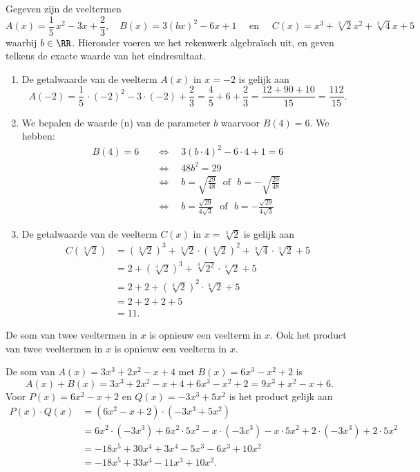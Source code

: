 \documentclass{ximera}
\begin{document}
\begin{example}
Gegeven zijn de veeltermen
\[
A(x) = \frac{1}{5}\,x^2-3x+\frac{2}{3}, \quad B(x) = 3(bx)^2-6x+1 \quad \text{ en } \quad C(x) = x^3 + \sqrt[3]{2} x^2 + \sqrt[3]{4}x+5
\]
waarbij $b \in \RR$. Hieronder voeren we het rekenwerk algebra\"isch uit, en geven telkens de exacte waarde van het eindresultaat. 
\begin{enumerate}

\item
De getalwaarde van de veelterm $A(x)$ in $x = -2$ is gelijk aan
\[
A(-2) = \frac{1}{5}\,\cdot (-2)^2-3\cdot(-2)+\frac{2}{3} = \frac{4}{5} +6+ \frac{2}{3} = \frac{12 + 90 + 10}{15} = \frac{112}{15}.
\]
\item
We bepalen de waarde (n) van de parameter $b$ waarvoor $B(4) = 6$. We hebben:
\begin{align*}
B(4) = 6 \quad 
& \Leftrightarrow \quad 3(b\cdot 4)^2-6\cdot 4+1 = 6 \\ 
& \Leftrightarrow \quad 48b^2 = 29 \\
& \Leftrightarrow \quad b = \sqrt{\frac{29}{48}} \,\,\text{ of }\,\, b = - \sqrt{\frac{29}{48}} \\
& \Leftrightarrow \quad b = \frac{\sqrt{29}}{4\sqrt{3}} \,\,\text{ of }\,\, b = - \frac{\sqrt{29}}{4\sqrt{3}}
\end{align*}
\item
De getalwaarde van de veelterm $C(x)$ in $x = \sqrt[3]{2}$ is gelijk aan
\begin{align*}
C(\sqrt[3]{2}) & = (\sqrt[3]{2})^3 + \sqrt[3]{2}\cdot(\sqrt[3]{2})^2 + \sqrt[3]{4}\cdot \sqrt[3]{2}+5 \\
& = 2 + (\sqrt[3]{2})^3 + \sqrt[3]{2^2}\cdot \sqrt[3]{2} + 5 \\
& = 2 + 2 + (\sqrt[3]{2})^2 \cdot \sqrt[3]{2} + 5 \\
& = 2 + 2 + 2 + 5 \\
& = 11.
\end{align*}
\end{enumerate}
\end{example}

De som van twee veeltermen in $x$ is opnieuw een veelterm in $x$. Ook het product van twee veeltermen in $x$ is opnieuw een veelterm in $x$. 

\begin{example}
De som van $A(x) = 3x^3+2x^2-x+4$ met $B(x) = 6x^3-x^2+2$ is 
\[
A(x) + B(x) = 3x^3+2x^2-x+4 + 6x^3-x^2+2 = 9x^3 + x^2 - x + 6.
\]
Voor $P(x) = 6x^2-x+2$ en $Q(x) = -3x^3+5x^2$ is het product gelijk aan
\begin{align*}
P(x) \cdot Q(x) 
& = (6x^2-x+2) \cdot (-3x^3+5x^2) \\
& = 6x^2 \cdot (-3x^3) + 6x^2\cdot 5x^2 - x \cdot(-3x^3) - x \cdot 5x^2 + 2 \cdot(-3x^3) + 2 \cdot 5x^2 \\
& = -18x^5 + 30x^4 + 3x^4 - 5x^3 - 6x^3 + 10x^2 \\
& = -18x^5 + 33x^4 - 11x^3 + 10x^2.
\end{align*}
\end{example}
\end{document}
